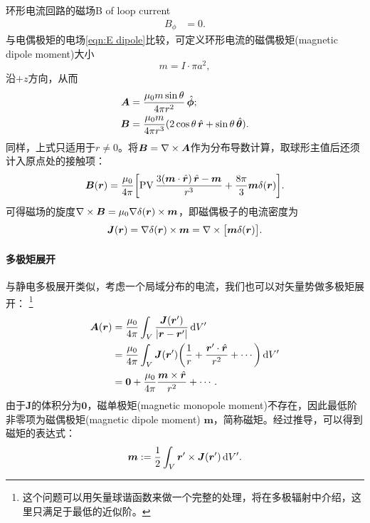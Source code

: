 \begin{example}{环形电流回路的磁场}{B of loop current}
\begin{align*}
        B_\phi &= 0.
    \end{align*}
    与电偶极矩的电场\eqref{eqn:E dipole}比较，可定义环形电流的磁偶极矩(magnetic dipole moment)大小
    \[
        m = I \cdot \pi a^2,
    \]
    沿$+z$方向，从而 
    \begin{subequations}
        \begin{align}
            \label{eqn:A dipole}
            \bm A &= \frac{\mu_0m\sin\theta}{4\pi r^2}\mathop{}\!\hat{\bm{\phi}};\\
            \label{eqn:B dipole }
            \bm B &= \frac{\mu_0m}{4\pi r^3}(2\cos\theta\mathop{}\!\hat{\bm{r}} + \sin\theta\mathop{}\!\hat{\bm{\theta}}).
        \end{align}
    \end{subequations}
    同样，上式只适用于$r \neq 0$。将$\bm B = \nabla\times\bm A$作为分布导数计算，取球形主值后还须计入原点处的接触项：
    \begin{equation}
        \label{eqn:B dipole with delta}
        \bm B(\bm r) = \frac{\mu_0}{4\pi}\biggl[\operatorname{PV}\frac{3(\bm m \cdot \mathop{}\!\hat{\bm{r}})\mathop{}\!\hat{\bm{r}} - \bm m}{r^3} + \frac{8\pi}3\bm m\delta(\bm r)\biggr].
    \end{equation}
    可得磁场的旋度$\nabla\times\bm B = \mu_0\nabla\delta(\bm r) \times \bm m$，即磁偶极子的电流密度为
    \begin{equation}
        \bm J(\bm r) = \nabla\delta(\bm r) \times \bm m = \nabla\times\bigl[\bm m\delta(\bm r)\bigr].
    \end{equation}
\end{example}

\paragraph{多极矩展开}

与静电多极展开类似，考虑一个局域分布的电流，我们也可以对矢量势做多极矩展开：
\footnote{这个问题可以用矢量球谐函数来做一个完整的处理，将在多极辐射中介绍，这里只满足于最低的近似阶。}
\begin{align}
    \notag
    \bm A(\bm r) &= \frac{\mu_0}{4\pi}\int_V\frac{\bm J(\bm r')}{\lvert\bm r - \bm r'\rvert}\mathop{}\!\mathrm{d} V'\\
    \notag
    &= \frac{\mu_0}{4\pi}\int_V\bm J(\bm r')\biggl(\frac1r + \frac{\bm r' \cdot \mathop{}\!\hat{\bm{r}}}{r^2} + \cdots\biggr)\mathop{}\!\mathrm{d} V'\\
    &= \bm 0 + \frac{\mu_0}{4\pi}\frac{\bm m \times \mathop{}\!\hat{\bm{r}}}{r^2} + \cdots.
\end{align}
由于$\bm J$的体积分为$\bm 0$，磁单极矩(magnetic monopole moment)不存在，因此最低阶非零项为磁偶极矩(magnetic dipole moment) $\bm m$，简称磁矩。经过推导，可以得到磁矩的表达式：
\begin{equation}
    \bm m := \frac12\int_V\bm r' \times \bm J(\bm r')\mathop{}\!\mathrm{d} V'.
\end{equation}

